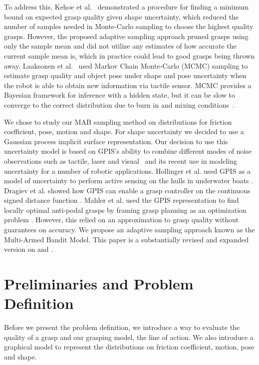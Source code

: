 \documentclass[journal,transmag]{IEEEtran}%
\begin{document}
To address this, Kehoe et al.~\cite{kehoe2012estimating} demonstrated a procedure for finding a minimum bound on expected grasp quality given shape uncertainty, which reduced the number of samples needed in Monte-Carlo sampling to choose the highest quality grasps. However, the proposed adaptive sampling approach pruned grasps using only the sample mean and did not utilize any estimates of how accurate the current sample mean is, which in practice could lead to good grasps being thrown away.
Laaksonen et al.~\cite{laaksonen2012probabilistic} used Markov Chain Monte-Carlo (MCMC) sampling to estimate grasp quality and object pose  under shape and pose uncertainty when the robot is able to obtain new information via tactile sensor.
MCMC provides a Bayesian framework for inference with a hidden state, but it can be slow to converge to the correct distribution due to burn in and mixing conditions~\cite{andrieu2003introduction}.

We chose to study our MAB sampling method on distributions for friction coefficient, pose, motion and shape. For shape uncertainty we decided to use a Gaussian process implicit surface representation. Our decision to use this uncertainty model is based on GPIS's ability to combine different modes of noise observations such as tactile, laser and visual~\cite{rasmussen2006, williams2007, dragiev2011} and its recent use in modeling uncertainty for a number of robotic applications.
Hollinger et al. used GPIS as a model of uncertainty to perform active sensing on the hulls in underwater boats \cite{hollinger2013}.
Dragiev et al. showed how GPIS can enable a grasp controller on the continuous signed distance function \cite{dragiev2011}.
Mahler et al. used the GPIS representation to find locally optimal anti-podal grasps by framing grasp planning as an optimization problem \cite{mahler2015gp}.  However, this relied on an approximation to grasp quality without guarantees on accuracy. We propose an adaptive sampling approach known as the Multi-Armed Bandit Model. This paper is a substantially revised and expanded version on \cite{laskey} and \cite{mahler2015gp}.




\section{Preliminaries and Problem Definition}
Before we present the problem definition, we introduce a way to evaluate the quality of a grasp and our grasping model, the line of action. We also introduce a graphical model to represent the distributions on friction coefficient, motion, pose and shape. 
\end{document}
